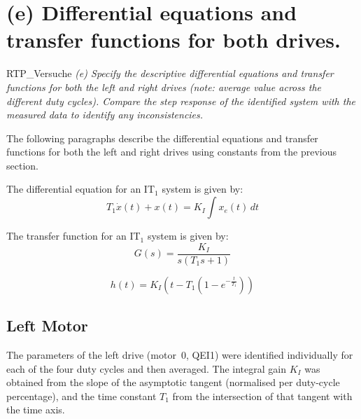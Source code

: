 \documentclass[12pt, oneside, a4paper]{scrreprt}
\begin{document}
            \cleardoubleemptypage

        \section{(e) Differential equations and transfer functions for both drives.}\label{sec:e-differential-equations}

            \begin{displaycquote}{RTP_Versuche}
                \footnotesize{\textit{(e) Specify the descriptive differential equations and transfer functions for both the left and right drives (note: average value across the different duty cycles). Compare the step response of the identified system with the measured data to identify any inconsistencies.}}
            \end{displaycquote}\label{task(e)}

            The following paragraphs describe the differential equations and transfer functions for both the left and right drives using constants from the previous section.

            The differential equation for an IT$_1$ system is given by:
            \begin{equation}
                T_1 \dot{x}(t) + x(t) = K_I \int x_e(t) \, dt
            \end{equation}

            The transfer function for an IT$_1$ system is given by:
            \begin{equation}
                G(s) = \frac{K_I}{s(T_1 s + 1)} 
            \end{equation}

            \begin{equation}
                h(t) = K_I \left( t - T_1 (1 - e^{-\frac{t}{T_1}}) \right)
            \end{equation}

            \subsection{Left Motor}\label{subsec:left-motor}

            The parameters of the left drive (motor~0, QEI1) were identified individually for each of the four duty cycles and then averaged. The integral gain $K_I$ was obtained from the slope of the asymptotic tangent (normalised per duty-cycle percentage), and the time constant $T_1$ from the intersection of that tangent with the time axis.
\end{document}
